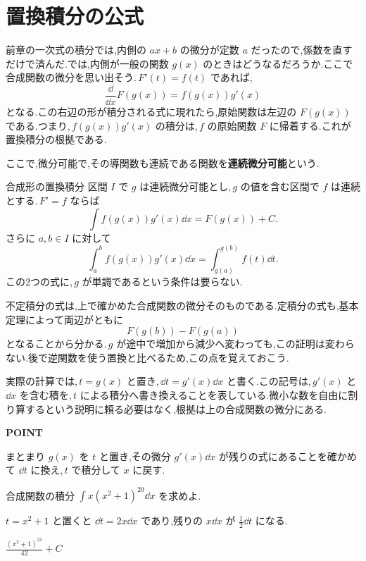 \section{置換積分の公式}\label{節:合成形の置換}

前章の一次式の積分では,内側の $ax+b$ の微分が定数 $a$ だったので,係数を直すだけで済んだ.では,内側が一般の関数 $g(x)$ のときはどうなるだろうか.ここで合成関数の微分を思い出そう.\,$F'(t)=f(t)$ であれば,
\[
 \frac{\dd}{\dd x}F(g(x))=f(g(x))g'(x)
\]
となる.この右辺の形が積分される式に現れたら,原始関数は左辺の $F(g(x))$ である.つまり,\,$f(g(x))g'(x)$ の積分は,\,$f$ の原始関数 $F$ に帰着する.これが置換積分の根拠である.

ここで,微分可能で,その導関数も連続である関数を\textbf{連続微分可能}という.\label{用語:連続微分可能}

\begin{theorem}{合成形の置換積分}
区間 $I$ で $g$ は連続微分可能とし,\,$g$ の値を含む区間で $f$ は連続とする.\,$F'=f$ ならば
\[
 \int f(g(x))g'(x)\dd x=F(g(x))+C.
\]
さらに $a,b\in I$ に対して
\[
 \int_a^b f(g(x))g'(x)\dd x
 =\int_{g(a)}^{g(b)}f(t)\dd t.
\]
この2つの式に,\,$g$ が単調であるという条件は要らない.
\end{theorem}

不定積分の式は,上で確かめた合成関数の微分そのものである.定積分の式も,基本定理によって両辺がともに
\[
 F(g(b))-F(g(a))
\]
となることから分かる.\,$g$ が途中で増加から減少へ変わっても,この証明は変わらない.後で逆関数を使う置換と比べるため,この点を覚えておこう.

実際の計算では,\,$t=g(x)$ と置き,\,$\dd t=g'(x)\dd x$ と書く.この記号は,\,$g'(x)$ と $\dd x$ を含む積を,\,$t$ による積分へ書き換えることを表している.微小な数を自由に割り算するという説明に頼る必要はなく,根拠は上の合成関数の微分にある.

\begin{bookpoint}
\textbf{POINT}\par
まとまり $g(x)$ を $t$ と置き,その微分 $g'(x)\dd x$ が残りの式にあることを確かめて $\dd t$ に換え,\,$t$ で積分して $x$ に戻す.
\end{bookpoint}

\begin{example}{合成関数の積分}
$\int x(x^2+1)^{20}\dd x$ を求めよ.
\end{example}

$t=x^2+1$ と置くと $\dd t=2x\dd x$ であり,残りの $x\dd x$ が $\frac12\dd t$ になる.

$\frac{(x^2+1)^{21}}{42}+C$

